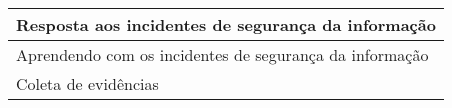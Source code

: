 \documentclass[portuguese,oneside]{tcc}
\begin{document}
\begin{table}[!t]
\begin{center}
\begin{tabular}{|l|}
Resposta aos incidentes de segurança da informação                                                                                                                                                                                                                                                           \\ \hline
Aprendendo com os incidentes de segurança da informação                                                                                                                                                                                                                                                      \\ \hline
Coleta de evidências                                                                                                                                                                                                                                                                                         \\ \hline
\end{tabular}
\end{center}
\end{table}

\end{document}
